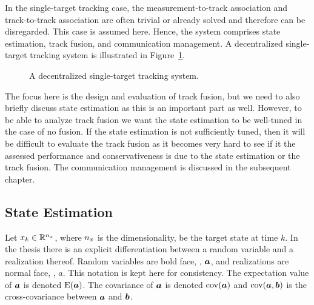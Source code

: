 In the single-target tracking case, the measurement-to-track association and track-to-track association are often trivial or already solved and therefore can be disregarded. This case is assumed here. Hence, the \abbrDTT system comprises state estimation, track fusion, and communication management. A decentralized single-target tracking system is illustrated in Figure~\ref{fig:intro:dstt-system}.

\begin{figure}[t]
	\centering
	\begin{tikzpicture}[scale=.9]
		
	\end{tikzpicture}
	\caption{A decentralized single-target tracking system. }
	\label{fig:intro:dstt-system}
\end{figure}

The focus here is the design and evaluation of track fusion, but we need to also briefly discuss state estimation as this is an important part as well. However, to be able to analyze track fusion we want the state estimation to be well-tuned in the case of no fusion. If the state estimation is not sufficiently tuned, then it will be difficult to evaluate the track fusion as it becomes very hard to see if it the assessed performance and conservativeness is due to the state estimation or the track fusion. The communication management is discussed in the subsequent chapter.




\subsection{State Estimation}

Let $x_k\in\realsnx$, where $\nx$ is the dimensionality, be the target state at time $k$. In the thesis there is an explicit differentiation between a random variable and a realization thereof. Random variables are bold face, \eg, $\bfa$, and realizations are normal face, \eg, $a$. This notation is kept here for consistency. The expectation value of $\bfa$ is denoted $\EV(\bfa)$. The covariance of $\bfa$ is denoted $\cov(\bfa)$ and $\cov(\bfa,\bfb)$ is the cross-covariance between $\bfa$ and $\bfb$.

